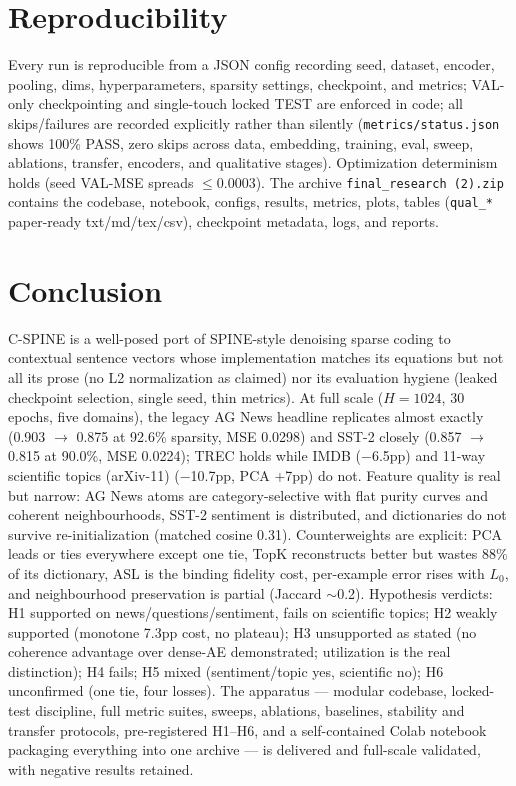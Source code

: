 \documentclass[conference]{IEEEtran}
\begin{document}
\section{Reproducibility}
Every run is reproducible from a JSON config recording seed, dataset,
encoder, pooling, dims, hyperparameters, sparsity settings, checkpoint, and
metrics; VAL-only checkpointing and single-touch locked TEST are enforced
in code; all skips/failures are recorded explicitly rather than silently
(\texttt{metrics/status.json} shows 100\% PASS, zero skips across data,
embedding, training, eval, sweep, ablations, transfer, encoders, and
qualitative stages). Optimization determinism holds (seed VAL-MSE spreads
$\le$0.0003). The archive \texttt{final\_research (2).zip} contains the
codebase, notebook, configs, results, metrics, plots, tables
(\texttt{qual\_*} paper-ready txt/md/tex/csv), checkpoint metadata, logs,
and reports.

\section{Conclusion}
C-SPINE is a well-posed port of SPINE-style denoising sparse coding to
contextual sentence vectors whose implementation matches its equations but
not all its prose (no L2 normalization as claimed) nor its evaluation
hygiene (leaked checkpoint selection, single seed, thin metrics). At full
scale ($H=1024$, 30 epochs, five domains), the legacy AG News headline
replicates almost exactly (0.903 $\rightarrow$ 0.875 at 92.6\% sparsity,
MSE 0.0298) and SST-2 closely (0.857 $\rightarrow$ 0.815 at 90.0\%, MSE
0.0224); TREC holds while IMDB ($-$6.5pp) and 11-way scientific topics (arXiv-11)
($-$10.7pp, PCA +7pp) do not. Feature quality is real but narrow: AG News
atoms are category-selective with flat purity curves and coherent
neighbourhoods, SST-2 sentiment is distributed, and dictionaries do not
survive re-initialization (matched cosine 0.31). Counterweights are
explicit: PCA leads or ties everywhere except one tie, TopK reconstructs
better but wastes 88\% of its dictionary, ASL is the binding fidelity cost,
per-example error rises with $L_0$, and neighbourhood preservation is
partial (Jaccard $\sim$0.2). Hypothesis verdicts: H1 supported on
news/questions/sentiment, fails on scientific topics; H2 weakly supported
(monotone 7.3pp cost, no plateau); H3 unsupported as stated (no coherence
advantage over dense-AE demonstrated; utilization is the real distinction);
H4 fails; H5 mixed (sentiment/topic yes, scientific no); H6 unconfirmed
(one tie, four losses). The apparatus --- modular codebase, locked-test
discipline, full metric suites, sweeps, ablations, baselines, stability and
transfer protocols, pre-registered H1--H6, and a self-contained Colab
notebook packaging everything into one archive --- is delivered and
full-scale validated, with negative results retained.
\end{document}
